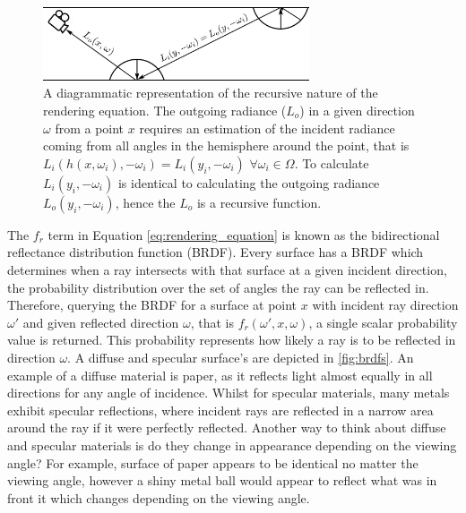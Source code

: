 \documentclass[ %
                    author={Callum Pearce},
                supervisor={Dr. Neill Campbell},
                    degree={MEng},
                     title={How effective are Temporal difference learning methods for reducing the number of zero contribution light paths while still accurately approximating Global Illumination in Path tracing?},
                  subtitle={},
                      type={research},
                      year={2019} ]{dissertation}
\begin{document}
\begin{figure}[h]
\begin{center}
\includegraphics[width=0.7\textwidth]{images/rendering_equation.png}    
\end{center}
\caption{A diagrammatic representation of the recursive nature of the rendering equation. The outgoing radiance ($L_o$) in a given direction $\omega$ from a point $x$ requires an estimation of the incident radiance coming from all angles in the hemisphere around the point, that is $L_i(h(x, \omega_i),-\omega_i) = L_i(y_i, -\omega_i)$ $\forall \omega_i \in \Omega$. To calculate $L_i(y_i, -\omega_i)$ is identical to calculating the outgoing radiance $L_o(y_i, -\omega_i)$, hence the $L_o$ is a recursive function. }
\label{fig:recursive_rendering}
\end{figure}

The $f_r$ term in Equation \ref{eq:rendering_equation} is known as the bidirectional reflectance distribution function (BRDF). Every surface has a BRDF which determines when a ray intersects with that surface at a given incident direction, the probability distribution over the set of angles the ray can be reflected in. Therefore, querying the BRDF for a surface at point $x$ with incident ray direction $\omega'$ and given reflected direction $\omega$, that is $f_r(\omega', x , \omega)$,  a single scalar probability value is returned. This probability represents how likely a ray is to be reflected in direction $\omega$. A diffuse and specular surface's are depicted in \ref{fig:brdfs}. An example of a diffuse material is paper, as it reflects light almost equally in all directions for any angle of incidence. Whilst for specular materials, many metals exhibit specular reflections, where incident rays are reflected in a narrow area around the ray if it were perfectly reflected. Another way to think about diffuse and specular materials is do they change in appearance depending on the viewing angle? For example, surface of paper appears to be identical no matter the viewing angle, however a shiny metal ball would appear to reflect what was in front it which changes depending on the viewing angle. 
\end{document}
